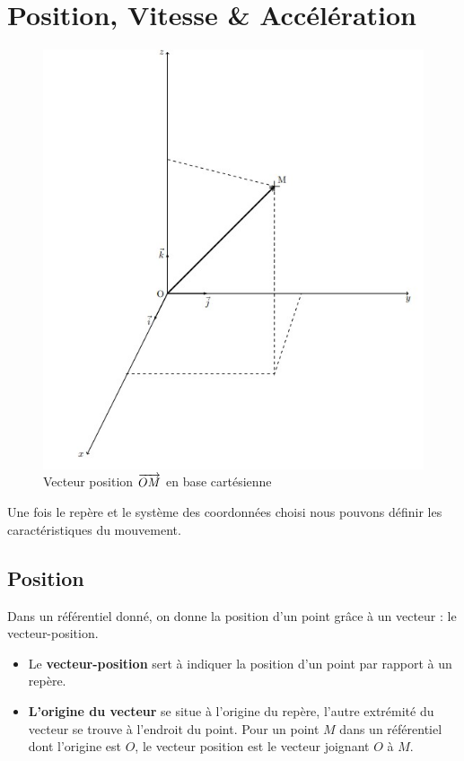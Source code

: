 \documentclass[11pt,a4paper]{article}
\begin{document}

\section{Position, Vitesse \& Accélération}

\begingroup
\begin{figure}
    \centering
    \includegraphics[width=0.9\linewidth]{imgs/p1/OM.jpg}
\caption{Vecteur position $\overrightarrow{OM}$ en base cartésienne}
\end{figure}

Une fois le repère et le système des coordonnées choisi nous pouvons définir les caractéristiques du mouvement. 

\subsection{Position}

Dans un référentiel donné, on donne la position d’un point grâce à un vecteur : le vecteur-position. 

\begin{itemize}
    \item Le \textbf{vecteur-position} sert à indiquer la position d’un point par rapport à un repère. 
    \item \textbf{L’origine du vecteur} se situe à l’origine du repère, l’autre extrémité du vecteur se trouve à l’endroit du point. Pour un point $M$ dans un référentiel dont l’origine est $O$, le vecteur position est le vecteur joignant $O$ à $M$.
\end{itemize}
\end{document}
